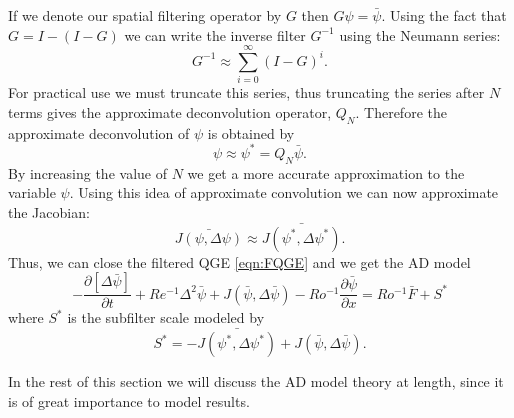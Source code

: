 If we denote our spatial filtering operator by $G$ then $G\psi = \bar{\psi}$. Using the fact that $G
= I - (I - G)$ we can write the inverse filter $G^{-1}$ using the Neumann series:
\begin{equation}
  G^{-1} \approx \sum_{i=0}^{\infty} (I - G)^i.
  \label{eqn:NeumannInverse}
\end{equation}
For practical use we must truncate this series, thus truncating the series after $N$ terms gives the
approximate deconvolution operator, $Q_N$. Therefore the approximate deconvolution of $\psi$ is
obtained by 
\begin{equation}
  \psi \approx \psi^* = Q_N \bar{\psi}.
  \label{eqn:ADOperator}
\end{equation}
By increasing the value of $N$ we get a more accurate approximation to the variable $\psi$. Using
this idea of approximate convolution we can now approximate the Jacobian:
\begin{equation}
  \bar{J(\psi,\Delta \psi)} \approx \bar{J(\psi^*, \Delta \psi^*)}.
  \label{eqn:ADJac}
\end{equation}
Thus, we can close the filtered QGE \eqref{eqn:FQGE} and we get the AD model
\begin{equation}
  -\frac{\partial [\Delta \bar{\psi}]}{\partial t} + Re^{-1} \Delta^2 \bar{\psi} 
    + J(\bar{\psi},\Delta \bar{\psi}) - Ro^{-1} \frac{\partial \bar{\psi}}{\partial x} = Ro^{-1}
    \bar{F} + S^*
  \label{eqn:ADQGE}
\end{equation}
where $S^*$ is the subfilter scale modeled by
\begin{equation}
  S^* = -\bar{J(\psi^*, \Delta \psi^*)} + J(\bar{\psi}, \Delta \bar{\psi}). 
  \label{eqn:ApproxSubfilter}
\end{equation}

In the rest of this section we will discuss the AD model theory at length, since it is of great
importance to model results. 

